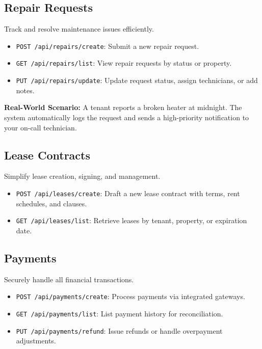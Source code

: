 \documentclass[11pt]{article}
\begin{document}
\subsection{Repair Requests}
Track and resolve maintenance issues efficiently.

\begin{itemize}[leftmargin=*]
  \item \texttt{POST /api/repairs/create}: Submit a new repair request.
  \item \texttt{GET /api/repairs/list}: View repair requests by status or property.
  \item \texttt{PUT /api/repairs/update}: Update request status, assign technicians, or add notes.
\end{itemize}

\begin{alertbox}
\noindent
\textbf{Real-World Scenario:}  
A tenant reports a broken heater at midnight. The system automatically logs the request and sends a high-priority notification to your on-call technician.
\end{alertbox}

\subsection{Lease Contracts}
Simplify lease creation, signing, and management.

\begin{itemize}[leftmargin=*]
  \item \texttt{POST /api/leases/create}: Draft a new lease contract with terms, rent schedules, and clauses.
  \item \texttt{GET /api/leases/list}: Retrieve leases by tenant, property, or expiration date.
\end{itemize}

\subsection{Payments}
Securely handle all financial transactions.

\begin{itemize}[leftmargin=*]
  \item \texttt{POST /api/payments/create}: Process payments via integrated gateways.
  \item \texttt{GET /api/payments/list}: List payment history for reconciliation.
  \item \texttt{PUT /api/payments/refund}: Issue refunds or handle overpayment adjustments.
\end{itemize}
\end{document}

